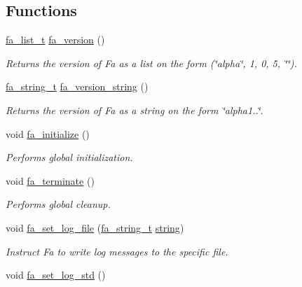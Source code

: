\subsection*{Functions}
\begin{DoxyCompactItemize}
\item 
\hyperlink{group___fa_list_ga35ecb12ab934ded0cce0bcf28e3bc5d2}{fa\-\_\-list\-\_\-t} \hyperlink{group___fa_utility_ga10bbb957eedee5b2a3c8e91a169f9991}{fa\-\_\-version} ()
\begin{DoxyCompactList}\small\item\em Returns the version of Fa as a list on the form {\ttfamily (\char`\"{}alpha\char`\"{}, 1, 0, 5, \char`\"{}\char`\"{})}. \end{DoxyCompactList}\item 
\hyperlink{group___fa_string_gacada63033b77bc6c39fa632ae199349b}{fa\-\_\-string\-\_\-t} \hyperlink{group___fa_utility_ga0f32aba533df7023c5d0948d6506b94e}{fa\-\_\-version\-\_\-string} ()
\begin{DoxyCompactList}\small\item\em Returns the version of Fa as a string on the form \char`\"{}alpha1..\char`\"{}. \end{DoxyCompactList}\item 
void \hyperlink{group___fa_utility_ga061c945c3f013c84561593911b661a44}{fa\-\_\-initialize} ()
\begin{DoxyCompactList}\small\item\em Performs global initialization. \end{DoxyCompactList}\item 
void \hyperlink{group___fa_utility_ga66c7af3a85045329f71966dfe40a5acf}{fa\-\_\-terminate} ()
\begin{DoxyCompactList}\small\item\em Performs global cleanup. \end{DoxyCompactList}\item 
void \hyperlink{group___fa_utility_ga09490b15451aa64808537eb688aa4604}{fa\-\_\-set\-\_\-log\-\_\-file} (\hyperlink{group___fa_string_gacada63033b77bc6c39fa632ae199349b}{fa\-\_\-string\-\_\-t} \hyperlink{util_8h_a41106000aac73b61e4fc2ef9dd39a603}{string})
\begin{DoxyCompactList}\small\item\em Instruct Fa to write log messages to the specific file. \end{DoxyCompactList}\item 
void \hyperlink{group___fa_utility_gaadd396f69e7ae709c4e224d893ff90a6}{fa\-\_\-set\-\_\-log\-\_\-std} ()

\end{DoxyCompactItemize}

